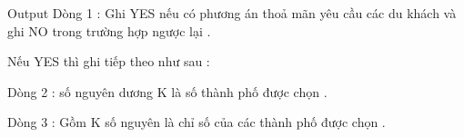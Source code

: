 Output
Dòng 1 : Ghi YES nếu có phương án thoả mãn yêu cầu các du khách và ghi NO trong trường hợp ngược lại .   


   Nếu YES thì ghi tiếp theo như sau :   


   Dòng 2 : số nguyên dương K là số thành phố được chọn .   


   Dòng 3 : Gồm K số nguyên là chỉ số của các thành phố được chọn .